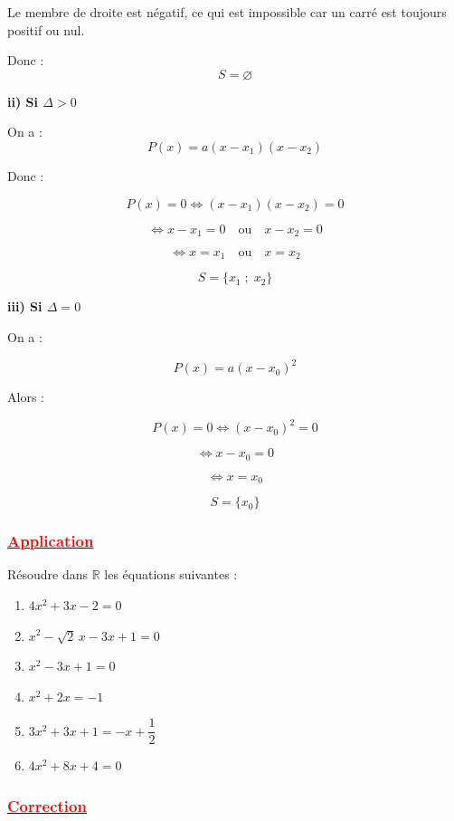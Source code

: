 \documentclass[12pt,a4paper]{article}
\begin{document}
Le membre de droite est négatif, ce qui est impossible car un carré est toujours positif ou nul.

Donc :
\[
S = \varnothing
\]

\bigskip

\textbf{ii) Si $\Delta > 0$}

On a :
\[
P(x) = a(x - x_1)(x - x_2)
\]

Donc :

\[
P(x)=0 \Longleftrightarrow (x - x_1)(x - x_2)=0
\]

\[
\Longleftrightarrow x - x_1 = 0 \quad \text{ou} \quad x - x_2 = 0
\]

\[
\Longleftrightarrow x = x_1 \quad \text{ou} \quad x = x_2
\]

\[
S = \{x_1 \; ; \; x_2\}
\]

\bigskip

\textbf{iii) Si $\Delta = 0$}

On a :

\[
P(x) = a(x - x_0)^2
\]

Alors :

\[
P(x)=0 \Longleftrightarrow (x - x_0)^2 = 0
\]

\[
\Longleftrightarrow x - x_0 = 0
\]

\[
\Longleftrightarrow x = x_0
\]

\[
S = \{x_0\}
\]

\subsubsection*{\underline{\textcolor{red}{Application}}}

Résoudre dans $\mathbb{R}$ les équations suivantes :

\begin{enumerate}
    \item $4x^2 + 3x - 2 = 0$
    
    \item $x^2 - \sqrt{2}\,x - 3x + 1 = 0$
    
    \item $x^2 - 3x + 1 = 0$
    
    \item $x^2 + 2x = -1$
    
    \item $3x^2 + 3x + 1 = -x + \dfrac{1}{2}$
    
    \item $4x^2 + 8x + 4 = 0$
\end{enumerate}
\subsubsection*{\underline{\textcolor{red}{Correction}}}
\end{document}
